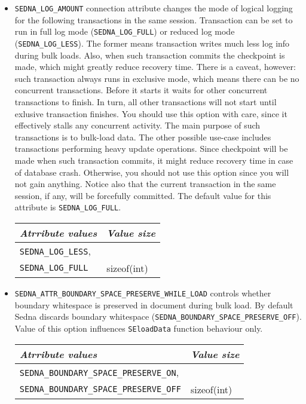 \documentclass[a4paper,12pt]{article}
\begin{document}
\begin{itemize}
\item\verb!SEDNA_LOG_AMOUNT! connection attribute changes the mode of logical
logging for the following transactions in the same session. Transaction can be
set to run in full log mode (\verb!SEDNA_LOG_FULL!) or reduced log mode
(\verb!SEDNA_LOG_LESS!). The former means transaction writes much less log info
during bulk loads. Also, when such transaction commits the checkpoint is made,
which might greatly reduce recovery time. There is a caveat, however: such
transaction always runs in exclusive mode, which means there can be no
concurrent transactions. Before it starts it waits for other concurrent
transactions to finish. In turn, all other transactions will not start until
exlusive transaction finishes. You should use this option with care, since it
effectively stalls any concurrent activity. The main purpose of such
transactions is to bulk-load data. The other possible use-case includes
transactions performing heavy update operations. Since checkpoint will be made
when such transaction commits, it might reduce recovery time in case of database
crash. Otherwise, you should not use this option since you will not gain
anything. Notice also that the current transaction in the same session, if any,
will be forcefully committed. The default value for this attribute is
\verb!SEDNA_LOG_FULL!.

\begin{tabular}{|l|l|}
\hline
\emph{Atrribute values} & \emph{Value size} \\
\hline
\verb!SEDNA_LOG_LESS!, & \\
\verb!SEDNA_LOG_FULL! & sizeof(int) \\
\hline
\end{tabular}

\item\verb!SEDNA_ATTR_BOUNDARY_SPACE_PRESERVE_WHILE_LOAD! controls whether
boundary whitespace is preserved in document during bulk load. By default Sedna
discards boundary whitespace (\verb!SEDNA_BOUNDARY_SPACE_PRESERVE_OFF!).
Value of this option influences \verb!SEloadData! function behaviour only.

\begin{tabular}{|l|l|}
\hline
\emph{Atrribute values} & \emph{Value size} \\
\hline
\verb!SEDNA_BOUNDARY_SPACE_PRESERVE_ON!, & \\
\verb!SEDNA_BOUNDARY_SPACE_PRESERVE_OFF! & sizeof(int) \\
\hline
\end{tabular}


\end{itemize}
\end{document}
